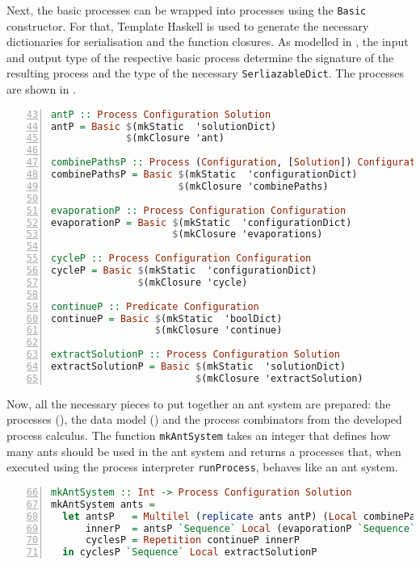 Next, the basic processes can be wrapped into processes using the \texttt{Basic} constructor. For that, \textsf{Template Haskell} is used to generate the necessary dictionaries for serialisation and the function closures. As modelled in , the input and output type of the respective basic process determine the signature of the resulting process and the type of the necessary \texttt{SerliazableDict}. The processes are shown in .

\begin{lstlisting}[language=Haskell,frame=tb,numbers=left,firstnumber=43,label=lst:ant_hive,caption={Processes, built up from previously defined basic processes.}, basicstyle=\footnotesize\ttfamily]
antP :: Process Configuration Solution
antP = Basic $(mkStatic  'solutionDict) 
             $(mkClosure 'ant)

combinePathsP :: Process (Configuration, [Solution]) Configuration
combinePathsP = Basic $(mkStatic  'configurationDict)
                      $(mkClosure 'combinePaths)

evaporationP :: Process Configuration Configuration
evaporationP = Basic $(mkStatic  'configurationDict)
                     $(mkClosure 'evaporations)

cycleP :: Process Configuration Configuration
cycleP = Basic $(mkStatic  'configurationDict)
               $(mkClosure 'cycle)

continueP :: Predicate Configuration
continueP = Basic $(mkStatic  'boolDict)
                  $(mkClosure 'continue)

extractSolutionP :: Process Configuration Solution
extractSolutionP = Basic $(mkStatic  'solutionDict)
                         $(mkClosure 'extractSolution)
\end{lstlisting}

Now, all the necessary pieces to put together an ant system are prepared: the processes (), the data model () and the process combinators from the developed process calculus. The function \texttt{mkAntSystem} takes an integer that defines how many ants should be used in the ant system and returns a processes that, when executed using the process interpreter \texttt{runProcess}, behaves like an ant system.

\begin{lstlisting}[language=Haskell,frame=tb,numbers=left,firstnumber=66,label=lst:ant_system_complete,caption=Transformation of a configuration for an ant system into a process hierarchy., basicstyle=\footnotesize\ttfamily]
mkAntSystem :: Int -> Process Configuration Solution
mkAntSystem ants =
  let antsP   = Multilel (replicate ants antP) (Local combinePathsP)
      innerP  = antsP `Sequence` Local (evaporationP `Sequence` cycleP)
      cyclesP = Repetition continueP innerP
  in cyclesP `Sequence` Local extractSolutionP
\end{lstlisting}

